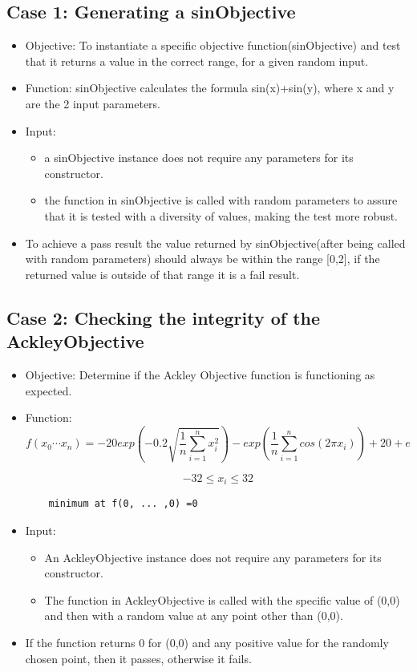 \documentclass[11pt]{article}
\begin{document}
\subsection{Case 1: Generating a sinObjective}
\begin{itemize}
    \item Objective: To instantiate a specific objective function(sinObjective) and test that it returns a value in the correct range, for a given random input.
    \item Function: sinObjective calculates the formula sin(x)+sin(y), where x and y are the 2 input parameters.
    \item Input:\begin{itemize}
        \item a sinObjective instance does not require any parameters for its constructor.
        \item the function in sinObjective is called with random parameters to assure that it is tested with a diversity of values, making the test more robust.
        \end{itemize}
    \item To achieve a pass result the value returned by sinObjective(after being called with random parameters) should always be within the range [0,2], if the returned value is outside of that range it is a fail result.
\end{itemize}
\subsection{Case 2: Checking the integrity of the AckleyObjective}
\begin{itemize}
	\item Objective: Determine if the Ackley Objective function is functioning as expected.
	\item Function:
	$$f(x_0 \cdots x_n) = -20 exp(-0.2 \sqrt{\frac{1}{n} \sum_{i=1}^n x_i^2}) - exp(\frac{1}{n} \sum_{i=1}^n cos(2\pi x_i)) + 20 + e$$ 
	
	$$-32 \leq x_i \leq 32$$ 
	\begin{center}
	\begin{verbatim}
	minimum at f(0, ... ,0) =0
	\end{verbatim}
	
	\end{center}
	
	
	\item Input: \begin{itemize}
		\item An AckleyObjective instance does not require any parameters for its constructor.
		\item The function in AckleyObjective is called with the specific value of (0,0) and then with a random value at any point other than (0,0).
	\end{itemize}
	\item If the function returns 0 for (0,0) and any positive value for the randomly chosen point, then it passes, otherwise it fails.
\end{itemize}
\end{document}
